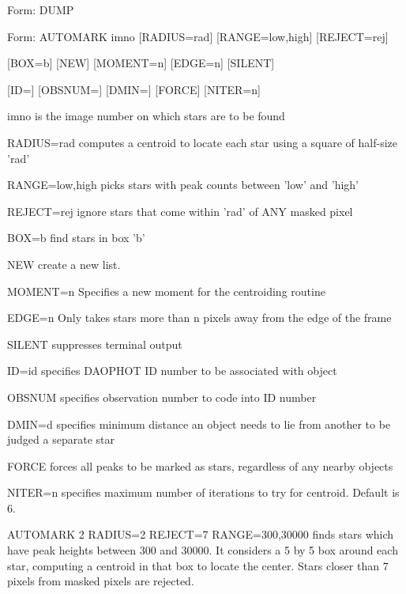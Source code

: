 {\newpage\clearpage
{}%
\begin{command}
  \item[Form: DUMP\hfill]{}
\end{command}%
\lthtmlfigureZ
\lthtmlcheckvsize\clearpage}

{\newpage\clearpage
{}%
\begin{command}
  \item[Form: AUTOMARK imno {[RADIUS=rad]} {[RANGE=low,high]} {[REJECT=rej]}\hfill]{}
  \item{{[BOX=b]} {[NEW]} {[MOMENT=n]} {[EDGE=n]} {[SILENT]}}
  \item{{[ID=]} {[OBSNUM=]} {[DMIN=]} {[FORCE]} {[NITER=n]}}
  \item[imno]{is the image number on which stars are
to be found}
  \item[RADIUS=rad]{computes a centroid to locate each star
using a square of half-size 'rad'}
  \item[RANGE=low,high]{picks stars with peak counts between 'low' and 'high'}
  \item[REJECT=rej]{ignore stars that come within 'rad' of
ANY masked pixel}
  \item[BOX=b]{find stars in box 'b'}
  \item[NEW]{create a new list.}
  \item[MOMENT=n]{Specifies a new moment for the centroiding routine}
  \item[EDGE=n]{Only takes stars more than n pixels away from the edge of the frame}
  \item[SILENT ]{suppresses terminal output}
  \item[ID=id]{specifies DAOPHOT ID number to be associated with object}
  \item[OBSNUM]{specifies observation number to code into ID number}
  \item[DMIN=d]{specifies minimum distance an object needs to
lie from another to be judged a separate star}
  \item[FORCE]{forces all peaks to be marked as stars,
regardless of any nearby objects}
  \item[NITER=n]{specifies maximum number of iterations to try for
centroid. Default is 6.}
\end{command}%
\lthtmlfigureZ
\lthtmlcheckvsize\clearpage}

{\newpage\clearpage
{}%
\begin{example}
  \item[AUTOMARK 2 RADIUS=2 REJECT=7 RANGE=300,30000\hfill]{
finds stars which have peak heights between 300 and 30000.  It 
considers a 5 by 5 box around each star, computing a centroid
in that box to locate the center.  Stars closer than 7 pixels
from masked pixels are rejected.}
\end{example}%
\lthtmlfigureZ
\lthtmlcheckvsize\clearpage}

